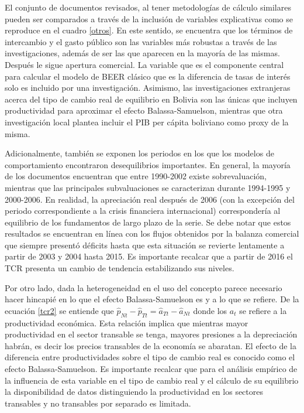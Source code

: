 \documentclass[12pt,letterpaper]{article}
\begin{document}

El conjunto de documentos revisados, al tener metodologías de cálculo similares pueden ser comparados a través de la inclusión de variables explicativas como se reproduce en el cuadro \ref{otros}. En este sentido, se encuentra que los términos de intercambio y el gasto público son las variables más robustas a través de las investigaciones, además de ser las que aparecen en la mayoría de las mismas. Después le sigue apertura comercial. La variable que es el componente central para calcular el modelo de BEER clásico que es la diferencia de tasas de interés solo es incluido por una investigación. Asimismo, las investigaciones extranjeras acerca del tipo de cambio real de equilibrio en Bolivia son las únicas que incluyen productividad para aproximar el efecto Balassa-Samuelson, mientras que otra investigación local plantea incluir el PIB per cápita boliviano como proxy de la misma.

Adicionalmente, también se exponen los periodos en los que los modelos de comportamiento encontraron desequilibrios importantes. En general, la mayoría de los documentos encuentran que entre 1990-2002 existe sobrevaluación, mientras que las principales subvaluaciones se caracterizan durante 1994-1995 y 2000-2006. En realidad, la apreciación real después de 2006 (con la excepción del periodo correspondiente a la crisis financiera internacional) correspondería al equilibrio de los fundamentos de largo plazo de la serie. Se debe notar que estos resultados se encuentran en línea con los flujos obtenidos por la balanza comercial que siempre presentó déficits hasta que esta situación se revierte lentamente a partir de 2003 y 2004 hasta 2015. Es importante recalcar que a partir de 2016 el TCR presenta un cambio de tendencia estabilizando sus niveles.

Por otro lado, dada la heterogeneidad en el uso del concepto parece necesario hacer hincapié en lo que el efecto Balassa-Samuelson es y a lo que se refiere. De la ecuación \ref{tcr2} se entiende que $\hat{p}_{Nt}-\hat{p}_{Tt}=\hat{a}_{Tt}-\hat{a}_{Nt}$ donde los $a_t$ se refiere a la productividad económica. Esta relación implica que mientras mayor productividad en el sector transable se tenga, mayores presiones a la depreciación habrán, es decir los precios transables de la economía se abaratan. El efecto de la diferencia entre productividades sobre el tipo de cambio real es conocido como el efecto Balassa-Samuelson. Es importante recalcar que para el análisis empírico de la influencia de esta variable en el tipo de cambio real y el cálculo de su equilibrio la disponibilidad de datos distinguiendo la productividad en los sectores transables y no transables por separado es limitada. 
\end{document}
